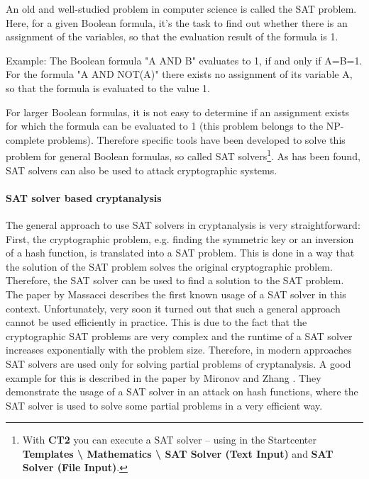 An old and well-studied problem in computer science is called the SAT problem. Here, for a given Boolean formula, it's the task to find out whether there is an assignment of the variables, so that the evaluation result of the formula is 1. 

Example: The Boolean formula "A AND B" evaluates to 1, if and only if A=B=1. For the formula "A AND NOT(A)" there exists no assignment of its variable A, so that the formula is evaluated to the value 1.

For larger Boolean formulas, it is not easy to determine if an assignment exists for which the formula can be evaluated to 1 (this problem belongs to the NP-complete problems). Therefore specific tools have been developed to solve this problem for general Boolean formulas, so called SAT solvers\footnote{
    With {\bf CT2} you can execute
    a SAT solver -- using in the Startcenter
    {\bf Templates
    \textbackslash{} Mathematics \textbackslash{}
    SAT Solver (Text Input)}  and  {\bf SAT Solver (File Input)}.
    }. As has been found, SAT solvers can also be used to attack cryptographic systems.


\paragraph*{SAT solver based cryptanalysis}\mbox{}
\hypertarget{ht_SAT-Solver_Cryptanalysis}{}

The general approach to use SAT solvers in cryptanalysis is very straightforward: First, the cryptographic problem, e.g. finding the symmetric key or an inversion of a hash function, is translated into a SAT problem. This is done in a way that the solution of the SAT problem solves the original cryptographic problem. Therefore, the SAT solver can be used to find a solution to the SAT problem. The paper by Massacci \cite{cm: Massacci2000} describes the first known usage of a SAT solver in this context. Unfortunately, very soon it turned out that such a general approach cannot be used efficiently in practice. This is due to the fact that the cryptographic SAT problems are very complex and the runtime of a SAT solver increases exponentially with the problem size. Therefore, in modern approaches SAT solvers are used only for solving partial problems of cryptanalysis. A good example for this is described in the paper by Mironov and Zhang \cite{cm: Mironov2006}. They demonstrate the usage of a SAT solver in an attack on hash functions, where the SAT solver is used to solve some partial problems in a very efficient way.



